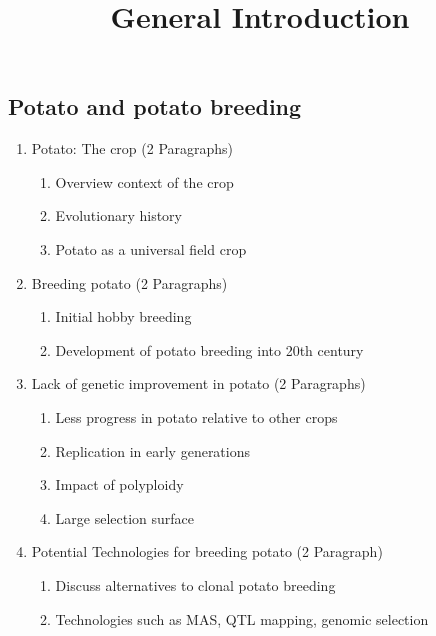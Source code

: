 \documentclass[
]{article}
\title{General Introduction}
\author{}
\date{}
\providecommand{\tightlist}{%
  \setlength{\itemsep}{0pt}\setlength{\parskip}{0pt}}\usepackage{longtable,booktabs,array}
\begin{document}
\maketitle


\subsection{Potato and potato
breeding}\label{potato-and-potato-breeding}

\begin{enumerate}
\def\labelenumi{\arabic{enumi}.}
\tightlist
\item
  Potato: The crop (2 Paragraphs)

  \begin{enumerate}
  \def\labelenumii{\roman{enumii})}
  \tightlist
  \item
    Overview context of the crop
  \item
    Evolutionary history
  \item
    Potato as a universal field crop
  \end{enumerate}
\item
  Breeding potato (2 Paragraphs)

  \begin{enumerate}
  \def\labelenumii{\roman{enumii})}
  \tightlist
  \item
    Initial hobby breeding
  \item
    Development of potato breeding into 20th century
  \end{enumerate}
\item
  Lack of genetic improvement in potato (2 Paragraphs)

  \begin{enumerate}
  \def\labelenumii{\roman{enumii})}
  \tightlist
  \item
    Less progress in potato relative to other crops
  \item
    Replication in early generations
  \item
    Impact of polyploidy
  \item
    Large selection surface
  \end{enumerate}
\item
  Potential Technologies for breeding potato (2 Paragraph)

  \begin{enumerate}
  \def\labelenumii{\roman{enumii})}
  \tightlist
  \item
    Discuss alternatives to clonal potato breeding
  \item
    Technologies such as MAS, QTL mapping, genomic selection
  \end{enumerate}
\end{enumerate}
\end{document}
